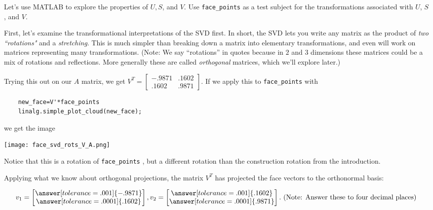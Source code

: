\documentclass{ximera}
\begin{document}
\begin{problem}
Let's use MATLAB to explore the properties of $U, S$, and $V$. Use \texttt{face\_points} as a test subject for the transformations associated with $U$, $S$, and $V$.


First, let's examine the transformational interpretations of the SVD first. In short, the SVD lets you write any matrix as the product of \emph{two ``rotations"} and a \emph{stretching}. This is much simpler than breaking down a matrix into elementary transformations, and even will work on matrices representing many transformations. (Note: We say ``rotations'' in quotes because in $2$ and $3$ dimensions these matrices could be a mix of rotations and reflections. More generally these are called \emph{orthogonal} matrices, which we'll explore later.)


  

  Trying this out on our $A$ matrix, we get $V^T=\begin{bmatrix}
    -.9871 & .1602 \\ .1602 & .9871
  \end{bmatrix}$. If we apply this to \texttt{face\_points}  with

  \begin{verbatim}
    new_face=V'*face_points
    linalg.simple_plot_cloud(new_face);
  \end{verbatim}

  we get the image

    \begin{center}
      \texttt{[image: face\_svd\_rots\_V\_A.png]}
    \end{center}

  Notice that this is a rotation of \texttt{face\_points} , but a different rotation than the construction rotation from the introduction.

  Applying what we know about orthogonal projections, the matrix $V^T$ has projected the face vectors to the orthonormal basis:

  

  $$v_1=\begin{bmatrix}\answer[tolerance=.001]{-.9871}\\\answer[tolerance=.0001]{.1602}\end{bmatrix}, v_2=\begin{bmatrix}\answer[tolerance=.001]{.1602}\\\answer[tolerance=.0001]{.9871}\end{bmatrix}. \text{ (Note: Answer these to four decimal places)}$$


\end{problem}
\end{document}
